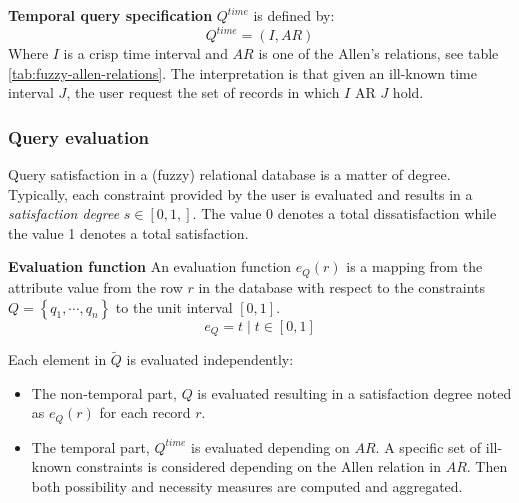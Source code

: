 \begin{svgraybox}
\begin{definition}
\textbf{Temporal query specification}
$Q^{time}$ is defined by:
\begin{equation}
Q^{time} = \left( I,AR \right)
\end{equation}
Where $I$ is a crisp time interval and $AR$ is one of the Allen's relations, see table \ref{tab:fuzzy-allen-relations}. The interpretation is that given an ill-known time interval $J$, the user request the set of records in which $I$ AR $J$ hold.
\end{definition}
\end{svgraybox}

\subsubsection{Query evaluation}
\label{subsubsec:query-evaluation}
Query satisfaction in a (fuzzy) relational database is a matter of degree. Typically, each constraint provided by the user is evaluated and results in a \emph{satisfaction degree} $s \in \left[ 0,1,\right]$. The value 0 denotes a total dissatisfaction while the value 1 denotes a total satisfaction.

\begin{svgraybox}
\begin{definition}
\label{def:evaluation-function}
\textbf{Evaluation function}
An evaluation function $e_{Q} \left( r \right)$ is a mapping from the attribute value from the row $r$ in the database with respect to the constraints $Q = \left \lbrace q_1, \cdots, q_n \right \rbrace$ to the unit interval $\left[ 0,1 \right]$. 
\begin{equation}
\label{eq:evaluation-function} 
e_{Q} = t \mid t \in \left[ 0,1 \right]
\end{equation}
\end{definition}
\end{svgraybox}


Each element in $\tilde{Q}$ is evaluated independently:
\begin{itemize}
\item
The non-temporal part, $Q$ is evaluated resulting in a satisfaction degree noted as $e_Q(r)$ for each record $r$.
\item
The temporal part, $Q^{time}$ is evaluated depending on $AR$. A specific set of ill-known constraints is considered depending on the Allen relation in $AR$. Then both possibility and necessity measures are computed and aggregated.
\end{itemize}

